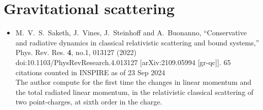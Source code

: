 \documentclass[a4paper,12pt]{article}
\begin{document}
    

\section*{Gravitational scattering}
\begin{itemize}
    \item %
    M.~V.~S.~Saketh, J.~Vines, J.~Steinhoff and A.~Buonanno,
    ``Conservative and radiative dynamics in classical relativistic scattering and bound systems,''
    Phys. Rev. Res. \textbf{4}, no.1, 013127 (2022)
    doi:10.1103/PhysRevResearch.4.013127
    [arXiv:2109.05994 [gr-qc]].
    65 citations counted in INSPIRE as of 23 Sep 2024\\
    The author compute for the first time the changes in linear momentum and the total radiated linear momentum, in the relativistic classical scattering of two
point-charges, at sixth order in the charge. 
\end{itemize}
\end{document}
